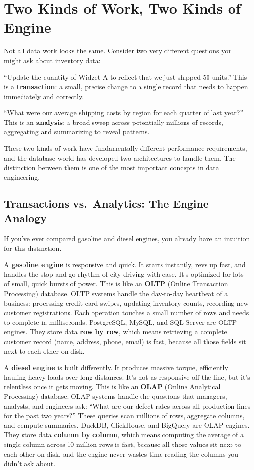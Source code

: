 \documentclass[
  letterpaper,
  DIV=11,
  numbers=noendperiod]{scrreprt}
\begin{document}
\section{Two Kinds of Work, Two Kinds of
Engine}\label{two-kinds-of-work-two-kinds-of-engine}

Not all data work looks the same. Consider two very different questions
you might ask about inventory data:

``Update the quantity of Widget A to reflect that we just shipped 50
units.'' This is a \textbf{transaction}: a small, precise change to a
single record that needs to happen immediately and correctly.

``What were our average shipping costs by region for each quarter of
last year?'' This is an \textbf{analysis}: a broad sweep across
potentially millions of records, aggregating and summarizing to reveal
patterns.

These two kinds of work have fundamentally different performance
requirements, and the database world has developed two architectures to
handle them. The distinction between them is one of the most important
concepts in data engineering.

\subsection{Transactions vs.~Analytics: The Engine
Analogy}\label{transactions-vs.-analytics-the-engine-analogy}

If you've ever compared gasoline and diesel engines, you already have an
intuition for this distinction.

A \textbf{gasoline engine} is responsive and quick. It starts instantly,
revs up fast, and handles the stop-and-go rhythm of city driving with
ease. It's optimized for lots of small, quick bursts of power. This is
like an \textbf{OLTP} (Online Transaction Processing) database. OLTP
systems handle the day-to-day heartbeat of a business: processing credit
card swipes, updating inventory counts, recording new customer
registrations. Each operation touches a small number of rows and needs
to complete in milliseconds. PostgreSQL, MySQL, and SQL Server are OLTP
engines. They store data \textbf{row by row}, which means retrieving a
complete customer record (name, address, phone, email) is fast, because
all those fields sit next to each other on disk.

A \textbf{diesel engine} is built differently. It produces massive
torque, efficiently hauling heavy loads over long distances. It's not as
responsive off the line, but it's relentless once it gets moving. This
is like an \textbf{OLAP} (Online Analytical Processing) database. OLAP
systems handle the questions that managers, analysts, and engineers ask:
``What are our defect rates across all production lines for the past two
years?'' These queries scan millions of rows, aggregate columns, and
compute summaries. DuckDB, ClickHouse, and BigQuery are OLAP engines.
They store data \textbf{column by column}, which means computing the
average of a single column across 10 million rows is fast, because all
those values sit next to each other on disk, and the engine never wastes
time reading the columns you didn't ask about.
\end{document}

